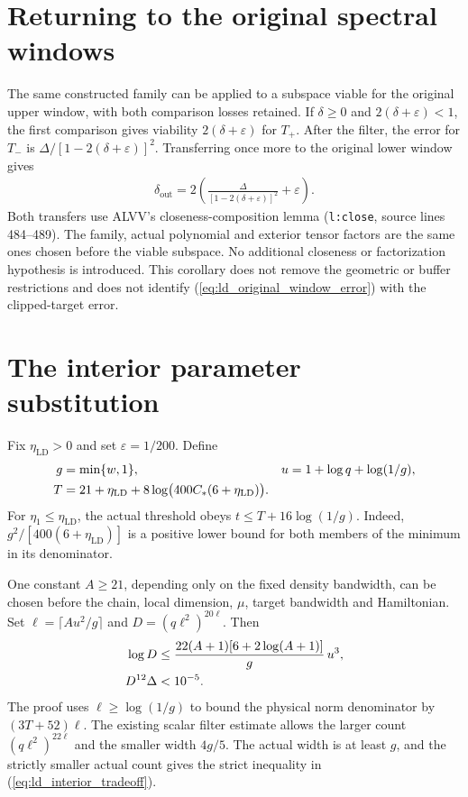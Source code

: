 \documentclass{article}
\begin{document}
\section{Returning to the original spectral windows}

The same constructed family can be applied to a subspace viable for the
original upper window, with both comparison losses retained. If
$\delta\ge0$ and $2(\delta+\varepsilon)<1$, the first comparison gives
viability $2(\delta+\varepsilon)$ for $T_+$. After the filter, the error
for $T_-$ is $\Delta/[1-2(\delta+\varepsilon)]^2$. Transferring once more
to the original lower window gives
\begin{align}
    \delta_{\mathrm{out}}=
      2\left(\frac{\Delta}{[1-2(\delta+\varepsilon)]^2}
        +\varepsilon\right).
    \label{eq:ld_original_window_error}
\end{align}
Both transfers use ALVV's closeness-composition lemma
(\texttt{l:close}, source lines 484--489).
The family, actual polynomial and exterior tensor factors are the same
ones chosen before the viable subspace. No additional closeness or
factorization hypothesis is introduced. This corollary does not remove
the geometric or buffer restrictions and does not identify
(\ref{eq:ld_original_window_error}) with the clipped-target error.

\section{The interior parameter substitution}

Fix $\eta_{\mathrm{LD}}>0$ and set $\varepsilon=1/200$. Define
\begin{align}
    g&=\min\{w,1\},& u&=1+\log q+\log(1/g),\notag\\
    T&=21+\eta_{\mathrm{LD}}+
      8\log\bigl(400C_*(6+\eta_{\mathrm{LD}})\bigr).
    \label{eq:ld_parameter_cap}
\end{align}
For $\eta_1\le\eta_{\mathrm{LD}}$, the actual threshold obeys
$t\le T+16\log(1/g)$. Indeed,
$g^2/[400(6+\eta_{\mathrm{LD}})]$ is a positive lower bound for both
members of the minimum in its denominator.

One constant $A\ge21$, depending only on the fixed density bandwidth,
can be chosen before the chain, local dimension, $\mu$, target bandwidth
and Hamiltonian. Set $\ell=\lceil Au^2/g\rceil$ and
$D=(q\ell^2)^{20\ell}$. Then
\begin{align}
    \log D&\le
      \frac{22(A+1)[6+2\log(A+1)]}{g}\,u^3,\notag\\
    D^{12}\Delta&<10^{-5}.
    \label{eq:ld_interior_tradeoff}
\end{align}
The proof uses $\ell\ge\log(1/g)$ to bound the physical norm denominator
by $(3T+52)\ell$. The existing scalar filter estimate allows the larger
count $(q\ell^2)^{22\ell}$ and the smaller width $4g/5$. The actual
width is at least $g$, and the strictly smaller actual count gives the
strict inequality in (\ref{eq:ld_interior_tradeoff}).
\end{document}
